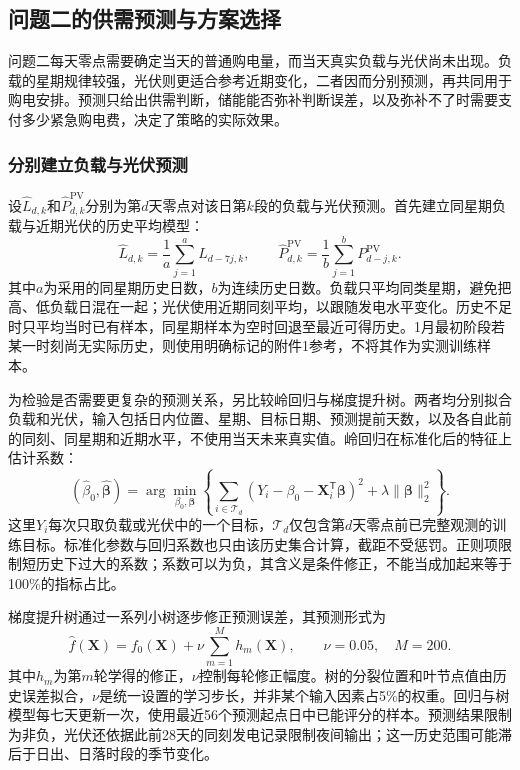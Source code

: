 \clearpage
\subsection{问题二的供需预测与方案选择}

问题二每天零点需要确定当天的普通购电量，而当天真实负载与光伏尚未出现。负载的星期规律较强，光伏则更适合参考近期变化，二者因而分别预测，再共同用于购电安排。预测只给出供需判断，储能能否弥补判断误差，以及弥补不了时需要支付多少紧急购电费，决定了策略的实际效果。

\subsubsection{分别建立负载与光伏预测}

设$\widehat L_{d,k}$和$\widehat P^{\mathrm{PV}}_{d,k}$分别为第$d$天零点对该日第$k$段的负载与光伏预测。首先建立同星期负载与近期光伏的历史平均模型：
\begin{equation}
 \widehat L_{d,k}=\frac{1}{a}\sum_{j=1}^{a}L_{d-7j,k},\qquad
 \widehat P^{\mathrm{PV}}_{d,k}=\frac{1}{b}\sum_{j=1}^{b}P^{\mathrm{PV}}_{d-j,k}.
 \label{eq:q2_history}
\end{equation}
其中$a$为采用的同星期历史日数，$b$为连续历史日数。负载只平均同类星期，避免把高、低负载日混在一起；光伏使用近期同刻平均，以跟随发电水平变化。历史不足时只平均当时已有样本，同星期样本为空时回退至最近可得历史。1月最初阶段若某一时刻尚无实际历史，则使用明确标记的附件1参考，不将其作为实测训练样本。

为检验是否需要更复杂的预测关系，另比较岭回归与梯度提升树。两者均分别拟合负载和光伏，输入包括日内位置、星期、目标日期、预测提前天数，以及各自此前的同刻、同星期和近期水平，不使用当天未来真实值。岭回归在标准化后的特征上估计系数：
\begin{equation}
 (\widehat\beta_0,\widehat{\boldsymbol\beta})=
 \arg\min_{\beta_0,\boldsymbol\beta}
 \left\{\sum_{i\in\mathcal T_d}
 (Y_i-\beta_0-\boldsymbol X_i^{\mathsf T}\boldsymbol\beta)^2
 +\lambda\lVert\boldsymbol\beta\rVert_2^2\right\}.
 \label{eq:q2_ridge}
\end{equation}
这里$Y_i$每次只取负载或光伏中的一个目标，$\mathcal T_d$仅包含第$d$天零点前已完整观测的训练目标。标准化参数与回归系数也只由该历史集合计算，截距不受惩罚。正则项限制短历史下过大的系数；系数可以为负，其含义是条件修正，不能当成加起来等于100\%的指标占比。

梯度提升树通过一系列小树逐步修正预测误差，其预测形式为
\begin{equation}
 \widehat f(\boldsymbol X)=f_0(\boldsymbol X)
 +\nu\sum_{m=1}^{M}h_m(\boldsymbol X),\qquad \nu=0.05,\quad M=200.
 \label{eq:q2_boosting}
\end{equation}
其中$h_m$为第$m$轮学得的修正，$\nu$控制每轮修正幅度。树的分裂位置和叶节点值由历史误差拟合，$\nu$是统一设置的学习步长，并非某个输入因素占5\%的权重。回归与树模型每七天更新一次，使用最近56个预测起点日中已能评分的样本。预测结果限制为非负，光伏还依据此前28天的同刻发电记录限制夜间输出；这一历史范围可能滞后于日出、日落时段的季节变化。

